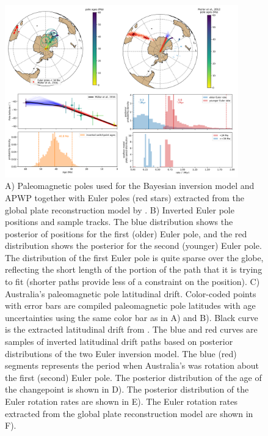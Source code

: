 \documentclass[11pt,letterpaper]{article}
\begin{document}
\begin{figure}
\includegraphics[width=0.9\textwidth]{fig_aus_inversion.png}
\caption{A) Paleomagnetic poles used for the Bayesian inversion model and APWP together with Euler poles (red stars) extracted from the global plate reconstruction model by \cite{Muller2016a}. B) Inverted Euler pole positions and sample tracks. The blue distribution shows the posterior of positions for the first (older) Euler pole, and the red distribution shows the posterior for the second (younger) Euler pole. The distribution of the first Euler pole is quite sparse over the globe, reflecting the short length of the portion of the path that it is trying to fit (shorter paths provide less of a constraint on the position). C) Australia's paleomagnetic pole latitudinal drift. Color-coded points with error bars are compiled paleomagnetic pole latitudes with age uncertainties using the same color bar as in A) and B). Black curve is the extracted latitudinal drift from \cite{Muller2016a}. The blue and red curves are samples of inverted latitudinal drift paths based on posterior distributions of the two Euler inversion model. The blue (red) segments represents the period when Australia's was rotation about the first (second) Euler pole. The posterior distribution of the age of the changepoint is shown in D). The posterior distribution of the Euler rotation rates are shown in E). The Euler rotation rates extracted from the global plate reconstruction model are shown in F). }
\label{fig:Aus_Cenozoic_track}
\end{figure}
\end{document}
